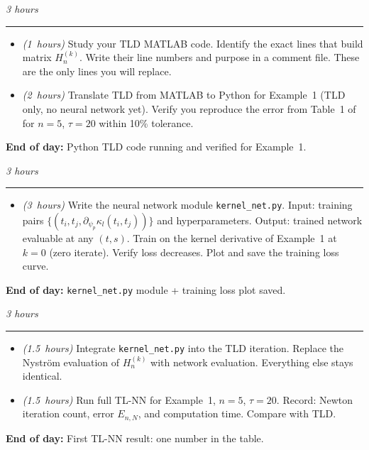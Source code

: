 \documentclass[12pt,a4paper]{article}
\newcommand{\hrs}[1]{\textit{\color{darkgray}(#1~hours)}}
\newcommand{\dayheading}[2]{%
  \vspace{0.3em}
  \noindent{\bfseries\color{darkblue}Day~#1}%
  \hfill{\small\color{darkgray}\textit{#2}}%
  \\[-0.4em]{\color{midgray}\rule{\linewidth}{0.4pt}}%
  \vspace{0.1em}
}
\begin{document}
\vspace{0.5em}

\begin{tcolorbox}[daystyle]
\dayheading{8}{3 hours}
\begin{itemize}[leftmargin=1.8em,itemsep=3pt]
  \item[\color{midblue}$\bullet$]
    \hrs{1} Study your TLD MATLAB code. Identify the exact
    lines that build matrix $H_n^{(k)}$. Write their
    line numbers and purpose in a comment file.
    These are the only lines you will replace.
  \item[\color{midblue}$\bullet$]
    \hrs{2} Translate TLD from MATLAB to Python for
    Example~1 (TLD only, no neural network yet). Verify
    you reproduce the error from Table~1 of
    \cite{sedka2025} for $n = 5$, $\tau = 20$
    within 10\% tolerance.
\end{itemize}
\noindent\textbf{End of day:}
Python TLD code running and verified for Example~1.
\end{tcolorbox}

\begin{tcolorbox}[daystyle]
\dayheading{9}{3 hours}
\begin{itemize}[leftmargin=1.8em,itemsep=3pt]
  \item[\color{midblue}$\bullet$]
    \hrs{3} Write the neural network module
    \texttt{kernel\_net.py}. Input: training pairs
    $\{(t_i, t_j, \partial_{\psi_p}\kappa_l(t_i,t_j))\}$
    and hyperparameters. Output: trained network evaluable
    at any $(t,s)$. Train on the kernel derivative of
    Example~1 at $k = 0$ (zero iterate). Verify loss
    decreases. Plot and save the training loss curve.
\end{itemize}
\noindent\textbf{End of day:}
\texttt{kernel\_net.py} module + training loss plot saved.
\end{tcolorbox}

\begin{tcolorbox}[daystyle]
\dayheading{10}{3 hours}
\begin{itemize}[leftmargin=1.8em,itemsep=3pt]
  \item[\color{midblue}$\bullet$]
    \hrs{1.5} Integrate \texttt{kernel\_net.py} into the
    TLD iteration. Replace the Nystr\"{o}m evaluation of
    $H_n^{(k)}$ with network evaluation.
    Everything else stays identical.
  \item[\color{midblue}$\bullet$]
    \hrs{1.5} Run full TL-NN for Example~1, $n = 5$,
    $\tau = 20$. Record: Newton iteration count, error
    $E_{n,N}$, and computation time. Compare with TLD.
\end{itemize}
\noindent\textbf{End of day:}
First TL-NN result: one number in the table.
\end{tcolorbox}
\end{document}
